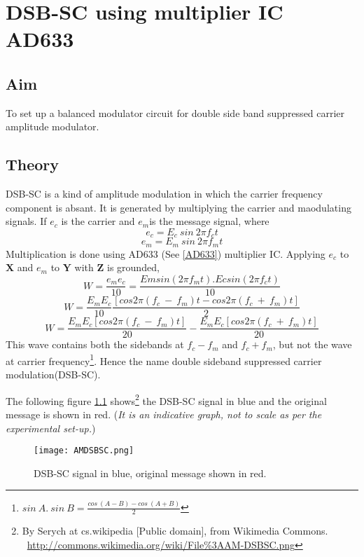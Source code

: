\chapter[DSB-SC using multiplier IC AD633]{DSB-SC using multiplier IC AD633}
\label{chapdsbsc}
\section*{Aim}
To set up a balanced modulator circuit for double side band suppressed carrier amplitude modulator.
\section*{Theory}
DSB-SC is a kind of amplitude modulation in which the carrier frequency component is absant. It is generated by multiplying the carrier and maodulating signals. If $e_c$ is the carrier and $e_m$is the message signal, where
\begin{equation}
e_c=E_c\  sin\ 2\pi f_ct
\end{equation}
\begin{equation}
e_m=E_m\  sin\ 2\pi f_mt
\end{equation}
Multiplication is done using AD633 (See \ref{AD633}) multiplier IC.
Applying $e_c$ to $\textbf{X}$ and $e_m$ to $\textbf{Y}$ with $\textbf{Z}$ is grounded, 
\begin{equation}
W= \frac{e_me_c}{10} =\frac{Emsin(2\pi f_mt).Ecsin(2\pi f_ct)}{10}
\end{equation}
\begin{equation}
W= \frac{E_mE_c}{10} \frac{[cos 2\pi (f_c\ -\ f_m)t-cos 2\pi (f_c\ +\ f_m)t]}{2}
\end{equation}
\begin{equation}
W= \frac{E_mE_c [cos 2\pi (f_c\ -\ f_m)t]}{20}- \frac{E_mE_c[cos 2\pi (f_c\ +\ f_m)t]}{20}
\end{equation}
This wave contains both the sidebands at $f_c-f_m$ and $f_c+f_m$, but not the wave at carrier frequency\footnote{$sin \ A.\ sin\ B=\frac{cos\ (A-B)-cos\ (A+B)}{2}$}. Hence the name double sideband suppressed carrier modulation(DSB-SC).

The following figure \ref{DSBSC} shows\footnote{By Serych at cs.wikipedia [Public domain], from Wikimedia Commons.  \ \url{http://commons.wikimedia.org/wiki/File\%3AAM-DSBSC.png}} the DSB-SC signal in blue and the original message is shown in red. (\emph{It is an indicative graph, not to scale as per the experimental set-up.})
\begin{figure}[h]
\begin{center}
\texttt{[image: AMDSBSC.png]}
\caption{DSB-SC signal in blue, original message shown in red.}
\label{DSBSC}
\end{center}

\end{figure}

